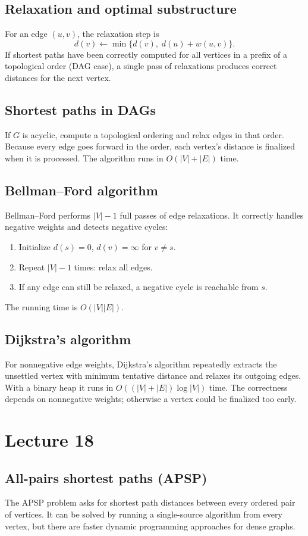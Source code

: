 \documentclass[11pt]{article}
\begin{document}
{{{{\subsection*{Relaxation and optimal substructure}
For an edge $(u,v)$, the relaxation step is
\[
d(v) \leftarrow \min\{d(v),\; d(u) + w(u,v)\}.
\]
If shortest paths have been correctly computed for all vertices in a prefix of a topological
order (DAG case), a single pass of relaxations produces correct distances for the next vertex.

\subsection*{Shortest paths in DAGs}
If $G$ is acyclic, compute a topological ordering and relax edges in that order. Because every
edge goes forward in the order, each vertex's distance is finalized when it is processed. The
algorithm runs in $O(|V|+|E|)$ time.

\subsection*{Bellman--Ford algorithm}
Bellman--Ford performs $|V|-1$ full passes of edge relaxations. It correctly handles negative
weights and detects negative cycles:
\begin{enumerate}
\item Initialize $d(s)=0$, $d(v)=\infty$ for $v \ne s$.
\item Repeat $|V|-1$ times: relax all edges.
\item If any edge can still be relaxed, a negative cycle is reachable from $s$.
\end{enumerate}
The running time is $O(|V||E|)$.

\subsection*{Dijkstra's algorithm}
For nonnegative edge weights, Dijkstra's algorithm repeatedly extracts the unsettled vertex with
minimum tentative distance and relaxes its outgoing edges. With a binary heap it runs in
$O((|V|+|E|)\log |V|)$ time. The correctness depends on nonnegative weights; otherwise a vertex
could be finalized too early.

\section{Lecture 18}

\subsection*{All-pairs shortest paths (APSP)}
The APSP problem asks for shortest path distances between every ordered pair of vertices. It can
be solved by running a single-source algorithm from every vertex, but there are faster dynamic
programming approaches for dense graphs.

}}}}
\end{document}
